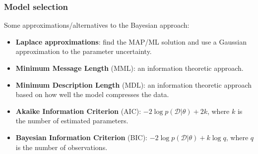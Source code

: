 \begin{frame}
\frametitle{Model selection}
Some approximations/alternatives to the Bayesian approach:
\begin{itemize}
\item {\bf Laplace approximations}: find the MAP/ML solution and use a Gaussian approximation to the parameter uncertainty.
\item {\bf Minimum Message Length} (MML): an information theoretic approach.
\item {\bf Minimum Description Length} (MDL): an information theoretic approach based on how well the model compresses the data.
\item {\bf Akaike Information Criterion} (AIC): $-2\log p(\mathcal{D}|\theta) + 2 k$, where $k$ is the number of estimated parameters.
\item {\bf Bayesian Information Criterion} (BIC): $-2\log p(\mathcal{D}|\theta) + k\log q$, where $q$ is the number of observations.
\end{itemize}
\end{frame}

